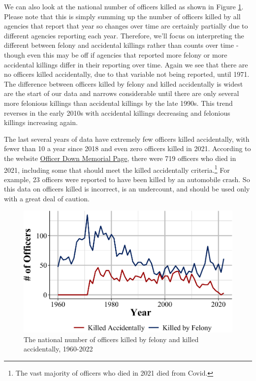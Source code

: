 \documentclass[
  12pt,
  openany]{book}
\begin{document}
We can also look at the national number of officers killed as shown in Figure \ref{fig:leokaOfficersKilledNational}. Please note that this is simply summing up the number of officers killed by all agencies that report that year so changes over time are certainly partially due to different agencies reporting each year. Therefore, we'll focus on interpreting the different between felony and accidental killings rather than counts over time - though even this may be off if agencies that reported more felony or more accidental killings differ in their reporting over time. Again we see that there are no officers killed accidentally, due to that variable not being reported, until 1971. The difference between officers killed by felony and killed accidentally is widest are the start of our data and narrows considerable until there are only several more felonious killings than accidental killings by the late 1990s. This trend reverses in the early 2010s with accidental killings decreasing and felonious killings increasing again.

The last several years of data have extremely few officers killed accidentally, with fewer than 10 a year since 2018 and even zero officers killed in 2021. According to the website \href{https://www.odmp.org/search/year?year=2021}{Officer Down Memorial Page}, there were 719 officers who died in 2021, including some that should meet the killed accidentally criteria.\footnote{The vast majority of officers who died in 2021 died from Covid.} For example, 23 officers were reported to have been killed by an automobile crash. So this data on officers killed is incorrect, is an undercount, and should be used only with a great deal of caution.

\begin{figure}

{\centering \includegraphics[width=0.9\linewidth]{07_leoka_files/figure-latex/leokaOfficersKilledNational-1} 

}

\caption{The national number of officers killed by felony and killed accidentally, 1960-2022}\label{fig:leokaOfficersKilledNational}
\end{figure}
\end{document}
